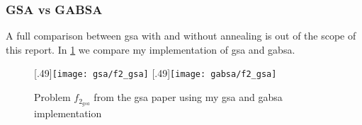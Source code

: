 \subsubsection*{GSA vs GABSA}
A full comparison between \ac{gsa} with and without annealing is out of the scope of this report. In \cref{fig:f2comp} we compare my implementation of \ac{gsa} and \ac{gabsa}.
%
\begin{figure}
	\centering
		[.49\linewidth]{\texttt{[image: gsa/f2\_gsa]}}
		[.49\linewidth]{\texttt{[image: gabsa/f2\_gsa]}}
	\caption{Problem $f_{2_{gsa}}$ from the \ac{gsa} paper\cite{GSA} using my \ac{gsa} and \ac{gabsa} implementation}
    \label{fig:f2comp}
\end{figure}
